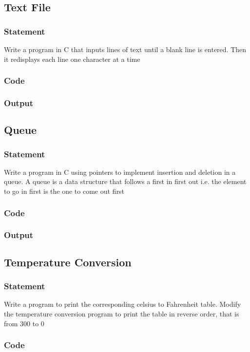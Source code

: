 \pagebreak
\subsection{Text File}
\subsubsection{Statement}
Write a program in C that inputs lines of text until a blank line is entered. Then it redisplays
each line one character at a time
\subsubsection{Code}
\subsubsection{Output}

\pagebreak
\subsection{Queue}
\subsubsection{Statement}
Write a program in C using pointers to implement insertion and deletion in a queue. A queue
is a data structure that follows a first in first out i.e. the element to go in first is the one to come
out first
\subsubsection{Code}
\subsubsection{Output}

\pagebreak
\subsection{Temperature Conversion}
\subsubsection{Statement}
Write a program to print the corresponding celsius to Fahrenheit table. Modify the
temperature conversion program to print the table in reverse order, that is from 300 to 0
\subsubsection{Code}
